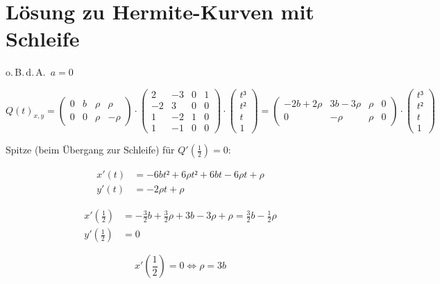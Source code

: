 \documentclass[a4paper,12pt]{scrartcl}
\newcommand{\pmat}[1]{\begin{pmatrix}#1\end{pmatrix}}
\begin{document}
 
\section*{Lösung zu Hermite-Kurven mit Schleife}



o.\,B.\,d.\,A.\ $a = 0$

\[ Q(t)_{x,y} = \pmat{ 0 & b & ρ & ρ \\ 0 & 0 & ρ & -ρ} ·
\pmat{2 & -3 & 0 & 1 \\ -2 & 3 & 0 & 0 \\ 1 & -2 & 1 & 0 \\ 1 & -1 & 0 & 0} ·
\pmat{t³ \\ t² \\ t \\ 1}
= \pmat{-2b + 2ρ & 3b - 3ρ & ρ & 0 \\ 0 & -ρ & ρ & 0} ·
\pmat{t³ \\ t² \\ t \\ 1} \]

Spitze (beim Übergang zur Schleife) für $Q'\left(\frac12\right) = 0$:

\begin{align*}
  x'(t) &= -6bt² + 6ρt² + 6bt - 6ρt + ρ \\
  y'(t) &= -2ρt + ρ
\end{align*}

\begin{align*}
  x'\left(\frac12\right) &= -\frac32 b + \frac32 ρ + 3b - 3ρ + ρ =
  \frac32 b -\frac12 ρ \\
  y'\left(\frac12\right) &= 0
\end{align*}

\[ x'\left(\frac12\right) = 0 ⇔ ρ = 3b \]
\end{document}
